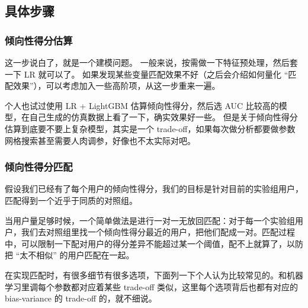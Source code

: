 \documentclass[12pt]{article}
\begin{document}
\subsection{具体步骤}
\subsubsection{倾向性得分估算}
这一步说白了，就是一个建模问题。
一般来说，按需做一下特征预处理，然后套一下 LR 就可以了。
如果发现某些变量匹配效果不好（之后会介绍如何量化 “匹配效果”），可以考虑加入一些高阶项，从这一步重来一遍。

个人也试过使用 LR + LightGBM 估算倾向性得分，然后选 AUC 比较高的模型，在自己生成的仿真数据上看了一下，确实效果好一些。
但是关于倾向性得分估算到底要不要上复杂模型，其实是一个
trade-off，如果每次做分析都要做参数网格搜索甚至需要人肉调参，好像也不太实际对吧。

\subsubsection{倾向性得分匹配}
假设我们已经有了每个用户的倾向性得分，我们的目标是针对目前的实验组用户，匹配得到一个近乎于同质的对照组。

当用户量足够时候，一个简单做法是进行一对一无放回匹配：对于每一个实验组用户，我们去对照组里找一个倾向性得分最近的用户，把他们配成一对。匹配过程中，可以限制一下配对用户的得分差异不能超过某一个阈值，配不上就算了，以防把 “太不相似” 的用户匹配在一起。

在实现匹配时，有很多细节有很多选项，下面列一下个人认为比较常见的。和机器学习里调每个参数都对应着某些 trade-off 类似，这里每个选项背后也都有对应的 bias-variance 的 trade-off 的，就不细说。
\end{document}

